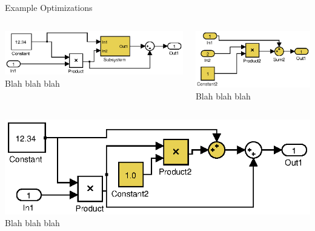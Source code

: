 \documentclass[final,hyperref={pdfpagelabels=false}]{beamer}
\begin{document}
\begin{frame}{}
\begin{columns}[t]
\begin{column}{.585\linewidth}
\begin{block}{Example Optimizations}
\begin{columns}[c]
\begin{column}{.485\linewidth}
\begin{center}
         \includegraphics[width=\linewidth]{images/models/Flatten1}\\
         Blah blah blah
         \end{center}
         \end{column}
         \begin{column}{.485\linewidth}
         \begin{center}
         \includegraphics[width=\linewidth]{images/models/Flatten1_subsystem}\\
         Blah blah blah
         \end{center}
         \end{column}
         \end{columns}
         \begin{center}
          \includegraphics[width=\linewidth]{images/models/Flatten1_export}\\
          Blah blah blah
          \end{center}
         
        \end{block}
      \end{column}


\end{columns}
\end{frame}
\end{document}
